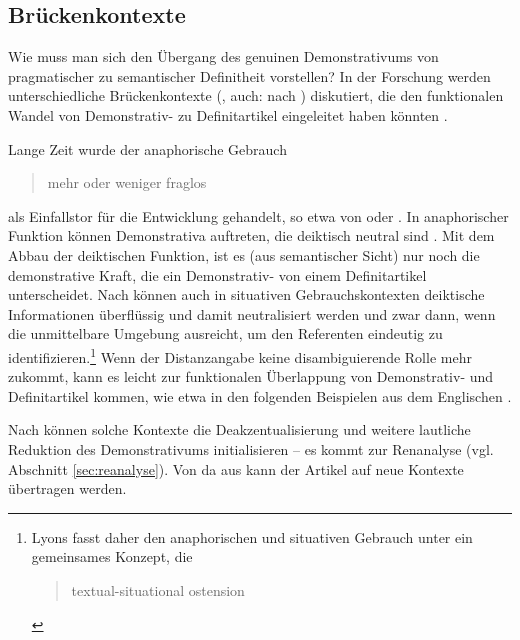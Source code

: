 \subsection{Brückenkontexte} \label{sec:bruecke}

Wie muss man sich den Übergang des genuinen Demonstrativums von pragmatischer zu semantischer Definitheit vorstellen? In der Forschung werden unterschiedliche Brückenkontexte (\textcite{Heine2002}, auch:  nach \cite{Diewald2002}) diskutiert, die den funktionalen Wandel von Demonstrativ- zu Definitartikel eingeleitet haben könnten \parencite[zur Übersicht s. auch][526--528]{deMulder2011}.

Lange Zeit wurde der anaphorische Gebrauch  \blockcquote[93]{Himmelmann1997}{mehr oder weniger fraglos} als Einfallstor für die Entwicklung gehandelt, so etwa von  \textcite{Oubouzar1989,Oubouzar1992} oder \textcite{Diessel1999}. In anaphorischer Funktion können Demonstrativa auftreten, die deiktisch neutral sind \parencite[41]{Lehmann2015}. Mit dem Abbau der deiktischen Funktion, ist es (aus semantischer Sicht) nur noch die demonstrative Kraft, die ein Demonstrativ- von einem Definitartikel unterscheidet. Nach \textcite[331ff.]{Lyons1999} können auch in situativen Gebrauchskontexten deiktische Informationen überflüssig und damit neutralisiert werden und zwar dann, wenn die unmittelbare Umgebung ausreicht, um den Referenten eindeutig zu identifizieren.\footnote{Lyons fasst daher den anaphorischen und situativen Gebrauch unter ein gemeinsames Konzept, die  \blockcquote[161]{Lyons1999}{textual-situational ostension}.} Wenn der Distanzangabe keine disambiguierende Rolle mehr zukommt, kann es leicht zur funktionalen Überlappung von Demonstrativ- und Definitartikel kommen, wie etwa in den folgenden Beispielen aus dem Englischen \parencite[164]{Lyons1999}. 


 \begin{exe}
	\ex 
	\begin{xlist} \label{ex:lyons}
		\ex \label{ex:lyons-sit}    
		\ex \label{ex:lyons-ana}   
		\end{xlist}
\end{exe}

\noindent
Nach \textcite[332]{Lyons1999} können solche Kontexte die Deakzentualisierung und weitere lautliche Reduktion des Demonstrativums  initialisieren -- es kommt zur Renanalyse (vgl. Abschnitt \ref{sec:reanalyse}). Von da aus kann der Artikel auf neue Kontexte übertragen werden. 

